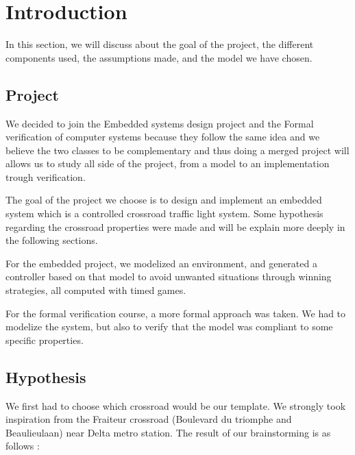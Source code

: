 \section{Introduction}
In this section, we will discuss about the goal of the project, the different components used, the assumptions made, and the model we have chosen.

\subsection{Project}

We decided to join the Embedded systems design project and the Formal verification of computer systems because they follow the same idea and we believe the two classes to be complementary and thus doing a merged project will allows us to study all side of the project, from a model to an implementation trough verification.

The goal of the project we choose is to design and implement an embedded system which is a controlled crossroad traffic light system. Some hypothesis regarding the crossroad properties were made and will be explain more deeply in the following sections.

For the embedded project, we modelized an environment, and generated a controller based on that model to avoid unwanted situations through winning strategies, all computed with timed games. 

For the formal verification course, a more formal approach was taken. We had to modelize the system, but also to verify that the model was compliant to some specific properties. 

\subsection{Hypothesis}

We first had to choose which crossroad would be our template. We strongly took inspiration from the Fraiteur crossroad (Boulevard du triomphe and Beaulieulaan) near Delta metro station. The result of our brainstorming is as follows :

